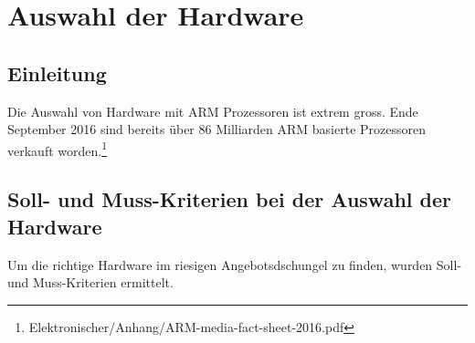 \chapter{Auswahl der Hardware}

\section{Einleitung}
Die Auswahl von Hardware mit ARM Prozessoren ist extrem gross.
Ende September 2016 sind bereits über 86 Milliarden ARM basierte Prozessoren verkauft worden.\footnote{Elektronischer/Anhang/ARM-media-fact-sheet-2016.pdf}


\section{Soll- und Muss-Kriterien bei der Auswahl der Hardware}
Um die richtige Hardware im riesigen Angebotsdschungel zu finden, wurden Soll- und Muss-Kriterien ermittelt.

